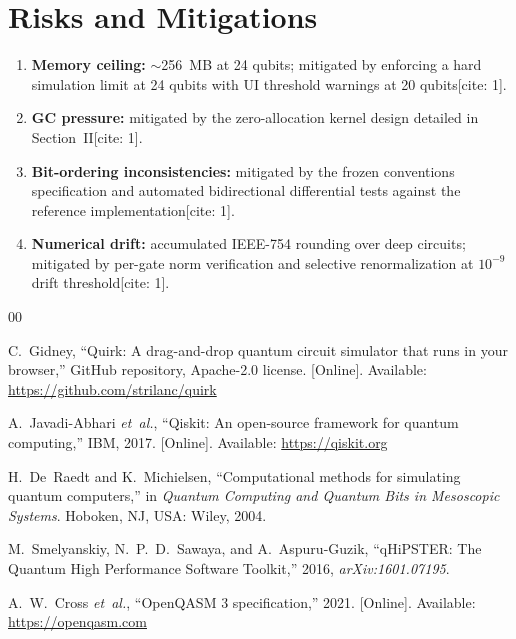 \documentclass[conference]{IEEEtran}
\begin{document}
\section{Risks and Mitigations}
\begin{enumerate}
    \item \textbf{Memory ceiling:} $\sim$256~MB at 24 qubits; mitigated by enforcing a hard simulation limit at 24 qubits with UI threshold warnings at 20 qubits[cite: 1].
    \item \textbf{GC pressure:} mitigated by the zero-allocation kernel design detailed in Section~II[cite: 1].
    \item \textbf{Bit-ordering inconsistencies:} mitigated by the frozen conventions specification and automated bidirectional differential tests against the reference implementation[cite: 1].
    \item \textbf{Numerical drift:} accumulated IEEE-754 rounding over deep circuits; mitigated by per-gate norm verification and selective renormalization at $10^{-9}$ drift threshold[cite: 1].
\end{enumerate}

\begin{thebibliography}{00}

C.~Gidney, ``Quirk: A drag-and-drop quantum circuit simulator that runs in your browser,'' GitHub repository, Apache-2.0 license. [Online]. Available: \url{https://github.com/strilanc/quirk}

A.~Javadi-Abhari \emph{et~al.}, ``Qiskit: An open-source framework for quantum computing,'' IBM, 2017. [Online]. Available: \url{https://qiskit.org}

H.~De~Raedt and K.~Michielsen, ``Computational methods for simulating quantum computers,'' in \emph{Quantum Computing and Quantum Bits in Mesoscopic Systems}. Hoboken, NJ, USA: Wiley, 2004.

M.~Smelyanskiy, N.~P.~D.~Sawaya, and A.~Aspuru-Guzik, ``qHiPSTER: The Quantum High Performance Software Toolkit,'' 2016, \emph{arXiv:1601.07195}.

A.~W.~Cross \emph{et~al.}, ``OpenQASM 3 specification,'' 2021. [Online]. Available: \url{https://openqasm.com}

\end{thebibliography}
\end{document}
